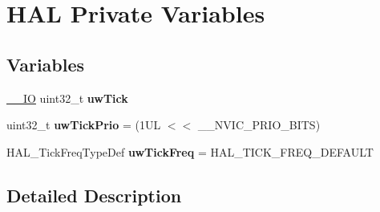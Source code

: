 \hypertarget{group___h_a_l___private___variables}{}\section{H\+AL Private Variables}
\label{group___h_a_l___private___variables}
\subsection*{Variables}
\begin{DoxyCompactItemize}
\item 
\mbox{\label{group___h_a_l___private___variables_ga9d411ea525781e633bf7ea7ef2f90728}} 
\mbox{\hyperlink{core__sc300_8h_aec43007d9998a0a0e01faede4133d6be}{\+\_\+\+\_\+\+IO}} uint32\+\_\+t {\bfseries uw\+Tick}
\item 
\mbox{\label{group___h_a_l___private___variables_ga3000c5e83924ed2debb1849c738d4be2}} 
uint32\+\_\+t {\bfseries uw\+Tick\+Prio} = (1\+U\+L $<$$<$ \+\_\+\+\_\+\+N\+V\+I\+C\+\_\+\+P\+R\+I\+O\+\_\+\+B\+I\+T\+S)
\item 
\mbox{\label{group___h_a_l___private___variables_ga84a0c55c4d0bff06a085b4fcfd6531cd}} 
H\+A\+L\+\_\+\+Tick\+Freq\+Type\+Def {\bfseries uw\+Tick\+Freq} = H\+A\+L\+\_\+\+T\+I\+C\+K\+\_\+\+F\+R\+E\+Q\+\_\+\+D\+E\+F\+A\+U\+LT
\end{DoxyCompactItemize}


\subsection{Detailed Description}
